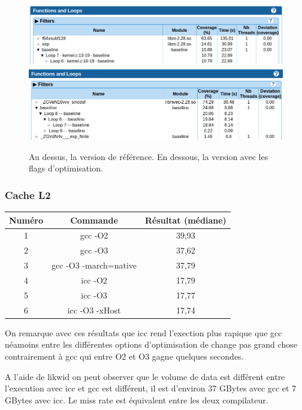 \documentclass[12pt,a4paper]{article}
\begin{document}
\begin{figure}[h]
    \centering
    \includegraphics[scale=0.5]{./figures/L1/maqao_noopt_ref_func.png}
    \includegraphics[scale=0.5]{./figures/L1/maqao_noopt_opt_func.png}
    \caption{Au dessus, la version de référence. En dessous, la version avec les
    flags d'optimisation.}
    \label{fig.maqao_noopt_func}
\end{figure}

\subsubsection{Cache L2}

\begin{tabular}{|c|c|c|}
  \hline
	Numéro  & Commande & Résultat (médiane)\\
  \hline
  1 & gcc -O2 & 39,93 \\
    \hline
  2 & gcc -O3 & 37,62 \\
    \hline
  3 & gcc -O3 -march=native & 37,79 \\
    \hline
  4 & icc -O2 & 17,79 \\
    \hline
  5 & icc -O3 & 17,77 \\
    \hline
  6 & icc -O3 -xHost & 17,74 \\
  \hline
\end{tabular}

On remarque avec ces résultats que icc rend l'exection plus rapique que 
gcc néamoins entre les différentes options d'optimisation de change pas 
grand chose contrairement à gcc qui entre O2 et O3 gagne quelques secondes.

A l'aide de likwid on peut observer que le volume de data est différent 
entre l'execution avec icc et gcc est différent, il est d'environ 37 GBytes 
avec gcc et 7 GBytes avec icc. Le miss rate est équivalent entre les deux 
compilateur.
\end{document}
